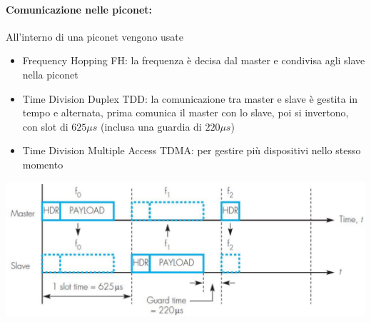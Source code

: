 \newpage

\paragraph{Comunicazione nelle piconet:} All'interno di una piconet vengono usate
\begin{itemize}
	\item Frequency Hopping FH: la frequenza è decisa dal master e condivisa agli slave nella piconet
	\item Time Division Duplex TDD: la comunicazione tra master e slave è gestita in tempo e alternata, prima comunica il master con lo slave, poi si invertono, con slot di $625\mu s$ (inclusa una guardia di $220 \mu s$)
	\item Time Division Multiple Access TDMA: per gestire più dispositivi nello stesso momento
\end{itemize}
\begin{center}
	\includegraphics[width=0.9\linewidth]{img/wpan/picocomm}
\end{center}

